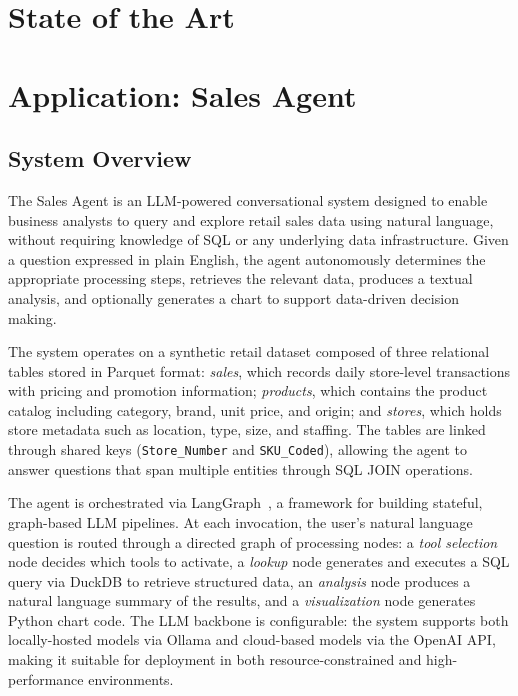 \documentclass[11pt,a4paper]{article}
\begin{document}
\section{State of the Art}
\label{sec:stateofart}


\section{Application: Sales Agent}
\label{sec:application}

\subsection{System Overview}
\label{subsec:overview}

The Sales Agent is an LLM-powered conversational system designed to enable business analysts
to query and explore retail sales data using natural language, without requiring knowledge of SQL
or any underlying data infrastructure. Given a question expressed in plain English, the agent
autonomously determines the appropriate processing steps, retrieves the relevant data, produces
a textual analysis, and optionally generates a chart to support data-driven decision making.

The system operates on a synthetic retail dataset composed of three relational tables stored in
Parquet format: \textit{sales}, which records daily store-level transactions with pricing and
promotion information; \textit{products}, which contains the product catalog including category,
brand, unit price, and origin; and \textit{stores}, which holds store metadata such as location,
type, size, and staffing. The tables are linked through shared keys (\texttt{Store\_Number} and
\texttt{SKU\_Coded}), allowing the agent to answer questions that span multiple entities through
SQL JOIN operations.

The agent is orchestrated via LangGraph~\cite{langgraph}, a framework for building stateful,
graph-based LLM pipelines. At each invocation, the user's natural language question is routed
through a directed graph of processing nodes: a \textit{tool selection} node decides which tools
to activate, a \textit{lookup} node generates and executes a SQL query via DuckDB to retrieve
structured data, an \textit{analysis} node produces a natural language summary of the results,
and a \textit{visualization} node generates Python chart code. The LLM backbone is configurable:
the system supports both locally-hosted models via Ollama and cloud-based models via the OpenAI API,
making it suitable for deployment in both resource-constrained and high-performance environments.
\end{document}
